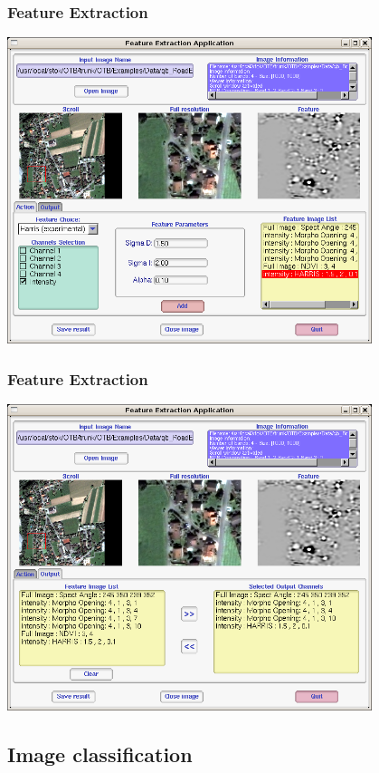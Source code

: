 \documentclass[compress]{beamer}
\begin{document}
\begin{frame}
  \frametitle{Feature Extraction}
      \begin{center}
      \includegraphics[width=0.80\textwidth]{Images/feature7.png}
  \end{center}
\end{frame}

\begin{frame}
  \frametitle{Feature Extraction}
      \begin{center}
      \includegraphics[width=0.80\textwidth]{Images/feature8.png}
  \end{center}
\end{frame}



\subsection{Image classification}
\end{document}
